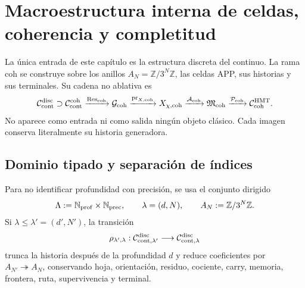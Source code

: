 \iffalse

\chapter{Macroestructura interna de celdas, coherencia y completitud}
\label{chap:pdfv2-coh-interna}

\begin{statusbox}
La única entrada de este capítulo es la estructura discreta del continuo. La
rama \(\mathrm{coh}\) se construye sobre los anillos
\(A_N=\mathbb Z/3^N\mathbb Z\), las celdas APP, sus historias y sus
terminales. Su cadena no ablativa es
\[
 \mathcal C_{\rm cont}^{\rm disc}
 \supset\mathcal C_{\rm cont}^{\rm coh}
 \xrightarrow{\operatorname{Res}_{\rm coh}}
 \mathcal G_{\rm coh}
 \xrightarrow{\operatorname{pr}_{X,{\rm coh}}}
 X_{\chi,{\rm coh}}
 \xrightarrow{\mathcal A_{\rm coh}}
 \mathfrak M_{\rm coh}
 \xrightarrow{\mathcal P_{\rm coh}}
 \mathcal C_{\rm coh}^{\rm HMT}.
\]
No aparece como entrada ni como salida ningún objeto clásico. Cada imagen
conserva literalmente su historia generadora.
\end{statusbox}

\section{Dominio tipado y separación de índices}
\label{sec:pdfv2-coh-domain}

Para no identificar profundidad con precisión, se usa el conjunto dirigido
\begin{equation}\label{eq:pdfv2-coh-lambda}
 \Lambda:=\mathbb N_{\rm prof}\times\mathbb N_{\rm prec},
 \qquad
 \lambda=(d,N),
 \qquad
 A_N:=\mathbb Z/3^N\mathbb Z.
\end{equation}
Si \(\lambda\leq\lambda'=(d',N')\), la transición
\begin{equation}\label{eq:pdfv2-coh-rho-lambda}
 \rho_{\lambda',\lambda}:
 \mathcal C_{{\rm cont},\lambda'}^{\rm disc}
 \longrightarrow
 \mathcal C_{{\rm cont},\lambda}^{\rm disc}
\end{equation}
trunca la historia después de la profundidad \(d\) y reduce coeficientes por
\(A_{N'}\twoheadrightarrow A_N\), conservando hoja, orientación, residuo,
cociente, carry, memoria, frontera, ruta, supervivencia y terminal.


